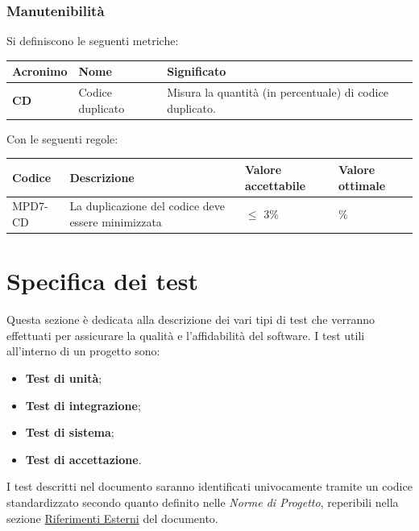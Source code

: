 \subsubsection{Manutenibilità}
Si definiscono le seguenti metriche:
\begin{table}[h!]
\centering
\def\arraystretch{1.5}
\begin{tabular}{ |m{2cm}|m{5.5cm}|m{6.5cm}| }
\hline
\rowcolor{lightgray!30}
\textbf{Acronimo} & \textbf{Nome} & \textbf{Significato}\\
\hline
\textbf{CD} & Codice duplicato & Misura la quantità (in percentuale) di codice duplicato.\\
\hline
\end{tabular}
\end{table}
\par Con le seguenti regole:
\begin{table}[h!]
\centering
\def\arraystretch{1.5}
\begin{tabular}{ |>{\centering\arraybackslash}m{2.5cm}|>{\centering\arraybackslash}m{5.5cm}|>{\centering\arraybackslash}m{3cm}|>{\centering\arraybackslash}m{3cm}| }
\hline
\rowcolor{black}
\textbf{\color{white} Codice} & \textbf{\color{white} Descrizione} & \textbf{\color{white} Valore accettabile} & \textbf{\color{white} Valore ottimale}\\
\hline
MPD7-CD & La duplicazione del codice deve essere minimizzata & $\leq$ 3\% & 0\% \\
\hline
\end{tabular}
\end{table}

\newpage
\section{Specifica dei test}\label{sec:test}
\par Questa sezione è dedicata alla descrizione dei vari tipi di test che verranno effettuati per assicurare la qualità e l'affidabilità del software.
I test utili all’interno di un progetto sono:
\begin{itemize}
    \item \textbf{Test di unità};
    \item \textbf{Test di integrazione};
    \item \textbf{Test di sistema};
    \item \textbf{Test di accettazione}.
\end{itemize}
I test descritti nel documento saranno identificati univocamente tramite un codice standardizzato secondo quanto definito nelle \textit{Norme di Progetto}, reperibili nella sezione \hyperref[sec:riferimenti_esterni]{Riferimenti Esterni} del documento.

